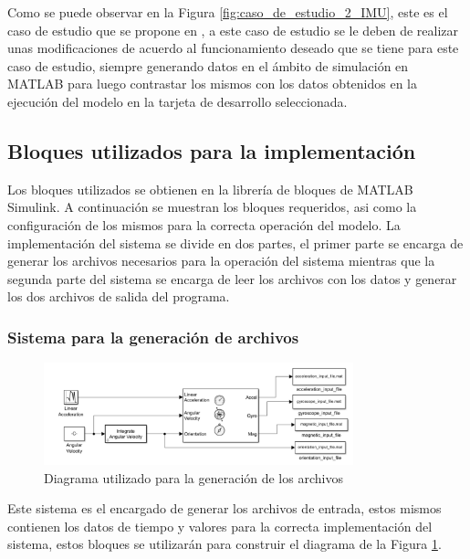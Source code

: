 Como se puede observar en la Figura \ref{fig:caso_de_estudio_2_IMU}, este es el caso de estudio que se propone en \cite{mathworks2024imu}, a este caso de estudio se le deben de realizar unas modificaciones de acuerdo al funcionamiento deseado que se tiene para este caso de estudio, siempre generando datos en el ámbito de simulación en MATLAB para luego contrastar los mismos con los datos obtenidos en la ejecución del modelo en la tarjeta de desarrollo seleccionada.

\subsection{Bloques utilizados para la implementación}

Los bloques utilizados se obtienen en la librería de bloques de MATLAB Simulink. A continuación se muestran los bloques requeridos, asi como la configuración de los mismos para la correcta operación del modelo. La implementación del sistema se divide en dos partes, el primer parte se encarga de generar los archivos necesarios para la operación del sistema mientras que la segunda parte del sistema se encarga de leer los archivos con los datos y generar los dos archivos de salida del programa.

\subsubsection{Sistema para la generación de archivos}\label{subsub:generación_de_archivos}

\begin{figure}[h!]
    \centering
    \includegraphics[width=0.8\textwidth]{fig/Capitulo5/Caso_de_estudio_IMU/Generador_de_archivos/flujo_generador_de_archivos.pdf}
    \caption{Diagrama utilizado para la generación de los archivos \cite{mathworks2024imu}}
    \label{fig:caso_de_estudio_2_IMU_generación_de_archivos}
\end{figure}

Este sistema es el encargado de generar los archivos de entrada, estos mismos contienen los datos de tiempo y valores para la correcta implementación del sistema, estos bloques se utilizarán para construir el diagrama de la Figura \ref{fig:caso_de_estudio_2_IMU_generación_de_archivos}.

